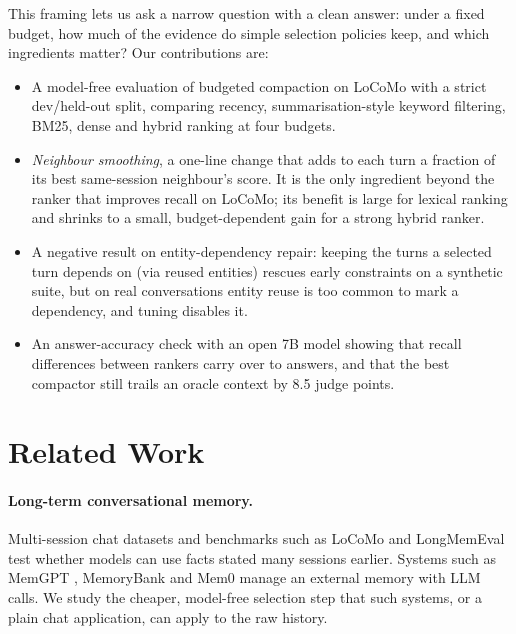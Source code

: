 \documentclass[11pt]{article}
\begin{document}
This framing lets us ask a narrow question with a clean answer: under a fixed budget, how much
of the evidence do simple selection policies keep, and which ingredients matter? Our
contributions are:

\begin{itemize}
  \item A model-free evaluation of budgeted compaction on LoCoMo \citep{maharana2024locomo}
        with a strict dev/held-out split, comparing recency, summarisation-style keyword
        filtering, BM25, dense and hybrid ranking at four budgets.
  \item \emph{Neighbour smoothing}, a one-line change that adds to each turn a fraction of its
        best same-session neighbour's score. It is the only ingredient beyond the ranker that
        improves recall on LoCoMo; its benefit is large for lexical ranking and shrinks to a
        small, budget-dependent gain for a strong hybrid ranker.
  \item A negative result on entity-dependency repair: keeping the turns a selected turn
        depends on (via reused entities) rescues early constraints on a synthetic suite, but on
        real conversations entity reuse is too common to mark a dependency, and tuning disables
        it.
  \item An answer-accuracy check with an open 7B model showing that recall differences between
        rankers carry over to answers, and that the best compactor still trails an oracle
        context by 8.5 judge points.
\end{itemize}

\section{Related Work}

\paragraph{Long-term conversational memory.}
Multi-session chat datasets \citep{xu2022goldfish} and benchmarks such as LoCoMo
\citep{maharana2024locomo} and LongMemEval \citep{wu2025longmemeval} test whether models can use
facts stated many sessions earlier. Systems such as MemGPT \citep{packer2023memgpt},
MemoryBank \citep{zhong2024memorybank} and Mem0 \citep{chhikara2025mem0} manage an external
memory with LLM calls. We study the cheaper, model-free selection step that such systems, or a
plain chat application, can apply to the raw history.
\end{document}
